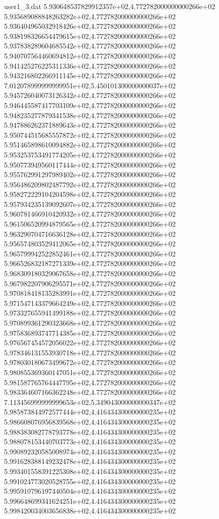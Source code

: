 \begin{filecontents}{user1_3.dat}
5.930648537829912357e+02,4.772782000000000266e+02
5.935689088848263282e+02,4.772782000000000266e+02
5.936404965032918426e+02,4.772782000000000266e+02
5.938198326654479615e+02,4.772782000000000266e+02
5.937838289604685542e+02,4.772782000000000266e+02
5.940707564460694812e+02,4.772782000000000266e+02
5.941425276225311336e+02,4.772782000000000266e+02
5.943216802266911145e+02,4.772782000000000266e+02
7.012078999999999951e+02,5.450101300000000037e+02
5.945726040073126342e+02,4.772782000000000266e+02
5.946445587417703109e+02,4.772782000000000266e+02
5.948235277879341538e+02,4.772782000000000266e+02
5.947886262371889643e+02,4.772782000000000266e+02
5.950744515685557872e+02,4.772782000000000266e+02
5.951465898610094882e+02,4.772782000000000266e+02
5.953253753491774205e+02,4.772782000000000266e+02
5.950773949560117444e+02,4.772782000000000266e+02
5.955762991297989402e+02,4.772782000000000266e+02
5.956486209802487792e+02,4.772782000000000266e+02
5.958272229104204598e+02,4.772782000000000266e+02
5.957934235139092607e+02,4.772782000000000266e+02
5.960781466910420932e+02,4.772782000000000266e+02
5.961506520994879565e+02,4.772782000000000266e+02
5.963290704716636128e+02,4.772782000000000266e+02
5.956574803529412065e+02,4.772782000000000266e+02
5.965799942522852461e+02,4.772782000000000266e+02
5.966526832187271339e+02,4.772782000000000266e+02
5.968309180329067658e+02,4.772782000000000266e+02
5.967982207906295571e+02,4.772782000000000266e+02
5.970818418135283991e+02,4.772782000000000266e+02
5.971547143379664249e+02,4.772782000000000266e+02
5.973327655941499188e+02,4.772782000000000266e+02
5.970899361290323668e+02,4.772782000000000266e+02
5.975836893747714385e+02,4.772782000000000266e+02
5.976567454572056022e+02,4.772782000000000266e+02
5.978346131553930718e+02,4.772782000000000266e+02
5.978030180673499672e+02,4.772782000000000266e+02
5.980855369360147051e+02,4.772782000000000266e+02
5.981587765764447795e+02,4.772782000000000266e+02
5.983364607166362248e+02,4.772782000000000266e+02
7.113456999999999653e+02,5.349043000000000347e+02
5.985873844972577444e+02,4.416434300000000235e+02
5.986608076956839568e+02,4.416434300000000235e+02
5.988383082778793778e+02,4.416434300000000235e+02
5.988078153440703773e+02,4.416434300000000235e+02
5.990892320585008974e+02,4.416434300000000235e+02
5.991628388149232478e+02,4.416434300000000235e+02
5.993401558391225308e+02,4.416434300000000235e+02
5.991024773020528755e+02,4.416434300000000235e+02
5.995910796197440504e+02,4.416434300000000235e+02
5.996648699341624251e+02,4.416434300000000235e+02
5.998420034003656838e+02,4.416434300000000235e+02

\end{filecontents}
